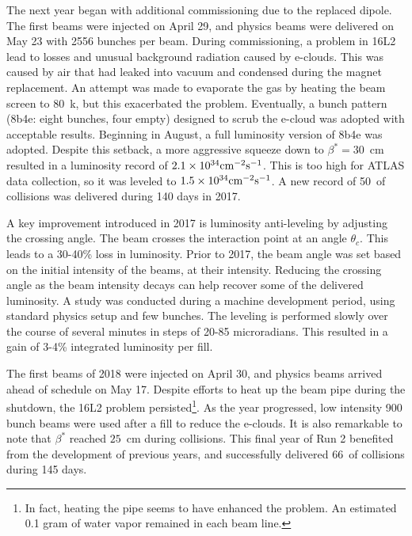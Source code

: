 The next year began with additional commissioning due to the replaced dipole.
The first beams were injected on April 29, and physics beams were delivered on May 23 with 2556 bunches per beam.
During commissioning, a problem in 16L2 lead to losses and unusual background radiation caused by e-clouds.
This was caused by air that had leaked into vacuum and condensed during the magnet replacement.
An attempt was made to evaporate the gas by heating the beam screen to 80~k, but this exacerbated the problem.
Eventually, a bunch pattern (8b4e: eight bunches, four empty) designed to scrub the e-cloud was adopted with acceptable results.
Beginning in August, a full luminosity version of 8b4e was adopted.\cite{lhcRun2}
Despite this setback, a more aggressive squeeze down to $\beta^*=30$~cm resulted in a luminosity record of $2.1\times10^{34}\text{cm}^{-2}\text{s}^{-1}$.
This is too high for ATLAS data collection, so it was leveled to $1.5\times10^{34}\text{cm}^{-2}\text{s}^{-1}$.
A new record of 50~\fb of collisions was delivered during 140 days in 2017.\cite{lhcRun2}

A key improvement introduced in 2017 is luminosity anti-leveling by adjusting the crossing angle.
The beam crosses the interaction point at an angle $\theta_c$.
This leads to a 30-40\% loss in luminosity. \cite{gorzawski}
Prior to 2017, the beam angle was set based on the initial intensity of the beams, at their intensity. \cite{gorzawski}
Reducing the crossing angle as the beam intensity decays can help recover some of the delivered luminosity.
A study was conducted during a machine development period, using standard physics setup and few bunches. \cite{gorzawski}
The leveling is performed slowly over the course of several minutes in steps of 20-85 microradians.
This resulted in a gain of 3-4\% integrated luminosity per fill.

The first beams of 2018 were injected on April 30, and physics beams arrived ahead of schedule on May 17.
Despite efforts to heat up the beam pipe during the shutdown, the 16L2 problem persisted\footnote{In fact, heating the pipe seems to have enhanced the problem. An estimated 0.1 gram of water vapor remained in each beam line.}.
As the year progressed, low intensity 900 bunch beams were used after a fill to reduce the e-clouds.
It is also remarkable to note that $\beta^*$ reached $25$~cm during collisions.
This final year of Run 2 benefited from the development of previous years, and successfully delivered 66~\fb of collisions during 145 days.


